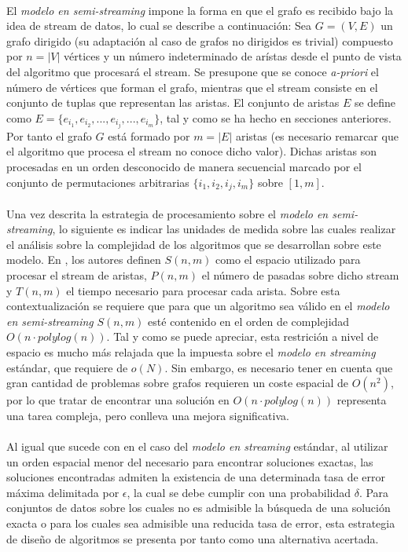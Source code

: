 \documentclass{subfiles}
\begin{document}
      \paragraph{}
      El \emph{modelo en semi-streaming} impone la forma en que el grafo es recibido bajo la idea de stream de datos, lo cual se describe a continuación: Sea $G = (V, E)$ un grafo dirigido (su adaptación al caso de grafos no dirigidos es trivial) compuesto por $n = |V|$ vértices y un número indeterminado de arístas desde el punto de vista del algoritmo que procesará el stream. Se presupone que se conoce \emph{a-priori} el número de vértices que forman el grafo, mientras que el stream consiste en el conjunto de tuplas que representan las aristas. El conjunto de aristas $E$ se define como $E = \{ e_{i_1}, e_{i_2}, ..., e_{i_j}, ..., e_{i_m} \}$, tal y como se ha hecho en secciones anteriores. Por tanto el grafo $G$ está formado por $m = |E|$ aristas (es necesario remarcar que el algoritmo que procesa el stream no conoce dicho valor). Dichas aristas son procesadas en un orden desconocido de manera secuencial marcado por el conjunto de permutaciones arbitrarias $\{ i_1, i_2, i_j, i_m \}$ sobre $[1, m]$.

      \paragraph{}
      Una vez descrita la estrategia de procesamiento sobre el \emph{modelo en semi-streaming}, lo siguiente es indicar las unidades de medida sobre las cuales realizar el análisis sobre la complejidad de los algoritmos que se desarrollan sobre este modelo. En \cite{feigenbaum2005graph}, los autores definen $S(n,m)$ como el espacio utilizado para procesar el stream de aristas, $P(n,m)$ el número de pasadas sobre dicho stream y $T(n,m)$ el tiempo necesario para procesar cada arista. Sobre esta contextualización se requiere que para que un algoritmo sea válido en el \emph{modelo en semi-streaming} $S(n,m)$ esté contenido en el orden de complejidad $O(n \cdot polylog(n))$. Tal y como se puede apreciar, esta restrición a nivel de espacio es mucho más relajada que la impuesta sobre el \emph{modelo en streaming} estándar, que requiere de $o(N)$. Sin embargo, es necesario tener en cuenta que gran cantidad de problemas sobre grafos requieren un coste espacial de $O(n^2)$, por lo que tratar de encontrar una solución en $O(n \cdot polylog(n))$ representa una tarea compleja, pero conlleva una mejora significativa.

      \paragraph{}
      Al igual que sucede con en el caso del \emph{modelo en streaming} estándar, al utilizar un orden espacial menor del necesario para encontrar soluciones exactas, las soluciones encontradas admiten la existencia de una determinada tasa de error máxima delimitada por $\epsilon$, la cual se debe cumplir con una probabilidad $\delta$. Para conjuntos de datos sobre los cuales no es admisible la búsqueda de una solución exacta o para los cuales sea admisible una reducida tasa de error, esta estrategia de diseño de algoritmos se presenta por tanto como una alternativa acertada.
\end{document}
